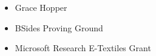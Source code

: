 \documentclass[../main.tex]{subfiles}
\begin{document}
\begin{itemize}
		\item{Grace Hopper}
		\item{BSides Proving Ground}
		\item{Microsoft Research E-Textiles Grant}
\end{itemize}
\end{document}
